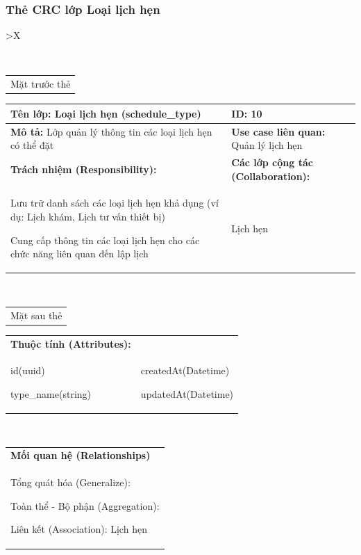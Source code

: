 \subsubsection{Thẻ CRC lớp Loại lịch hẹn}

\begin{xltabular}{\textwidth}{
		>{\centering\arraybackslash}X
	}
	\caption{\bfseries \fontsize{12pt}{0pt}\selectfont Thẻ CRC lớp Loại lịch hẹn}
	\\
	\begin{tabularx}{0.9\textwidth}{X}
		Mặt trước thẻ
	\end{tabularx}
	\begin{tabularx}{0.9\textwidth}{|X|X|}
		\hline
		\textbf{Tên lớp:} Loại lịch hẹn (schedule\_type)                   & \textbf{ID:} 10                                \\
		\hline
		\textbf{Mô tả:} Lớp quản lý thông tin các loại lịch hẹn có thể đặt & \textbf{Use case liên quan:}  Quản lý lịch hẹn \\
		\hline
		\textbf{Trách nhiệm (Responsibility):}                             & \textbf{Các lớp cộng tác (Collaboration):}     \\
		Lưu trữ danh sách các loại lịch hẹn khả dụng (ví dụ: Lịch khám, Lịch tư vấn thiết bị)

		Cung cấp thông tin các loại lịch hẹn cho các chức năng liên quan đến lập lịch
		                                                                   &
		Lịch hẹn
		\\
		\hline
	\end{tabularx}
	\\
	\begin{tabularx}{0.9\textwidth}{X}
		Mặt sau thẻ
	\end{tabularx}
	\begin{tabularx}{0.9\textwidth}{|X|X|}
		\hline
		\textbf{Thuộc tính (Attributes):} & \\
		id(uuid)

		type\_name(string)
		                                  &
		createdAt(Datetime)

		updatedAt(Datetime)
		\\ \hline
	\end{tabularx}
	\\
	\begin{tabularx}{0.9\textwidth}{|X|}
		\hline
		\textbf{Mối quan hệ (Relationships)} \\
		Tổng quát hóa (Generalize):

		Toàn thể - Bộ phận (Aggregation):

		Liên kết (Association): Lịch hẹn
		\\
		\hline
	\end{tabularx}
\end{xltabular}

